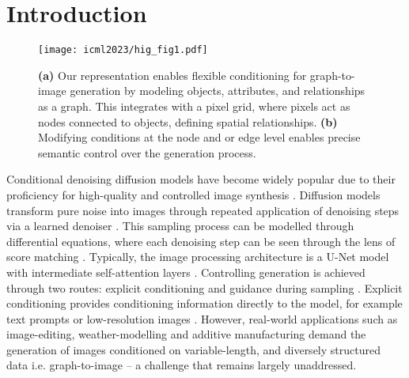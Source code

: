 \section{Introduction}
\label{sec:intro}

\begin{figure}[t]
    \centering
\texttt{[image: icml2023/hig\_fig1.pdf]}
    \vspace{-20bp}
    \caption{
\textbf{(a)} Our representation enables flexible conditioning for graph-to-image generation by modeling objects, attributes, and relationships as a graph. This integrates with a pixel grid, where pixels act as nodes connected to objects, defining spatial relationships. \textbf{(b)} Modifying conditions at the node and or edge level enables precise semantic control over the generation process.}
\label{fig:fig_1_intro}
\end{figure}


Conditional denoising diffusion models have become widely popular due to their proficiency for high-quality and controlled image synthesis \cite{saharia_image_2021, saharia_photorealistic_2022, karras_analyzing_2024, li_controlnet_2024, zhang_adding_2023, ramesh_hierarchical_2022}. Diffusion models transform pure noise into images through repeated application of denoising steps via a learned denoiser \cite{ho_denoising_2020, song_score-based_2021}. This sampling process can be modelled through differential equations, where each denoising step can be seen through the lens of score matching \cite{song_score-based_2021, hyvarinen_estimation_2005}. Typically, the image processing architecture is a U-Net model with intermediate self-attention layers \cite{ho_denoising_2020, saharia_image_2021, karras_analyzing_2024}. Controlling generation is achieved through two routes: explicit conditioning and guidance during sampling \cite{saharia_image_2021, karras_guiding_2024, ho_classifier-free_2022}. Explicit conditioning provides conditioning information directly to the model, for example text prompts or low-resolution images \cite{saharia_photorealistic_2022}. However, real-world applications such as image-editing, weather-modelling and additive manufacturing demand the generation of images conditioned on variable-length, and diversely structured data i.e. graph-to-image – a challenge that remains largely unaddressed.

